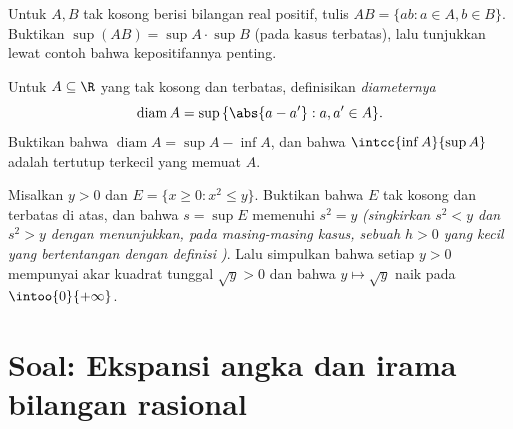 \begin{exercise}[$\star\star\star$]\label{exo:b1:reals:10}
Untuk $A, B$  tak kosong berisi bilangan real positif, tulis $AB = \{ab : a \in
A, b \in B\}$. Buktikan $\sup(AB) = \sup A \cdot \sup B$ (pada kasus terbatas),
lalu tunjukkan lewat contoh bahwa kepositifannya penting.
\end{exercise}

\begin{exercise}[$\star\star$]\label{exo:b1:reals:11}
Untuk $A \subseteq \R$ yang tak kosong dan terbatas, definisikan
\emph{diameternya}
\[
\operatorname{diam} A = \sup\,\{\abs{a - a'} : a, a' \in A\} .
\]
Buktikan bahwa $\operatorname{diam} A = \sup A - \inf A$, dan bahwa
$\intcc{\inf A}{\sup A}$ adalah  tertutup terkecil
yang memuat $A$.
\end{exercise}

\begin{exercise}[$\star\star\star$]\label{exo:b1:reals:12}
Misalkan $y > 0$ dan $E = \{x \geq 0 : x^2 \leq y\}$. Buktikan bahwa $E$
tak kosong dan terbatas di atas, dan bahwa $s = \sup E$ memenuhi $s^2 =
y$ \emph{(singkirkan $s^2 < y$ dan $s^2 > y$ dengan menunjukkan, pada masing-masing
kasus, sebuah $h > 0$ yang kecil yang bertentangan dengan definisi
)}. Lalu simpulkan bahwa setiap $y > 0$ mempunyai akar kuadrat tunggal
$\sqrt y > 0$ dan bahwa $y \mapsto \sqrt y$ naik pada
$\intoo{0}{+\infty}$.
\end{exercise}

\section{Soal: Ekspansi angka dan irama bilangan rasional}

